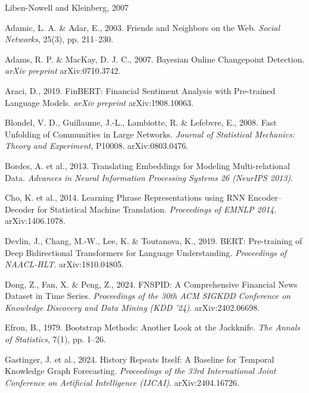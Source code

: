 \documentclass[a4paper,12pt]{report}
\begin{document}
\begin{thebibliography}{Liben-Nowell and Kleinberg, 2007}

Adamic, L. A. \& Adar, E., 2003. Friends and Neighbors on the Web. {\em Social
Networks}, 25(3), pp. 211--230.

Adams, R. P. \& MacKay, D. J. C., 2007. Bayesian Online Changepoint Detection.
{\em arXiv preprint} arXiv:0710.3742.

Araci, D., 2019. FinBERT: Financial Sentiment Analysis with Pre-trained
Language Models. {\em arXiv preprint} arXiv:1908.10063.

Blondel, V. D., Guillaume, J.-L., Lambiotte, R. \& Lefebvre, E., 2008. Fast
Unfolding of Communities in Large Networks. {\em Journal of Statistical
Mechanics: Theory and Experiment}, P10008. arXiv:0803.0476.

Bordes, A. et al., 2013. Translating Embeddings for Modeling Multi-relational
Data. {\em Advances in Neural Information Processing Systems 26 (NeurIPS 2013)}.

Cho, K. et al., 2014. Learning Phrase Representations using RNN
Encoder--Decoder for Statistical Machine Translation. {\em Proceedings of
EMNLP 2014}. arXiv:1406.1078.

Devlin, J., Chang, M.-W., Lee, K. \& Toutanova, K., 2019. BERT: Pre-training of
Deep Bidirectional Transformers for Language Understanding. {\em Proceedings of
NAACL-HLT}. arXiv:1810.04805.

Dong, Z., Fan, X. \& Peng, Z., 2024. FNSPID: A Comprehensive Financial News
Dataset in Time Series. {\em Proceedings of the 30th ACM SIGKDD Conference on
Knowledge Discovery and Data Mining (KDD '24)}. arXiv:2402.06698.

Efron, B., 1979. Bootstrap Methods: Another Look at the Jackknife. {\em The
Annals of Statistics}, 7(1), pp. 1--26.

Gastinger, J. et al., 2024. History Repeats Itself: A Baseline for Temporal
Knowledge Graph Forecasting. {\em Proceedings of the 33rd International Joint
Conference on Artificial Intelligence (IJCAI)}. arXiv:2404.16726.


\end{thebibliography}
\end{document}
